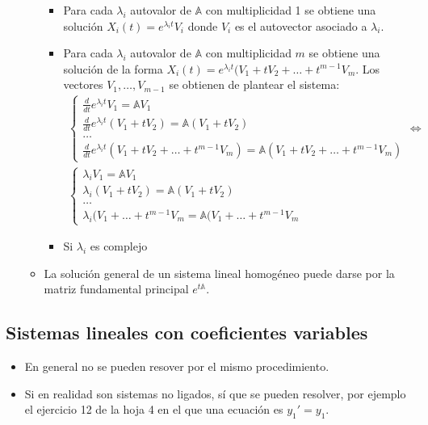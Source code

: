 \begin{itemize}
\begin{itemize}
    \begin{itemize}
    \item
      Para cada \(\lambda_i\) autovalor de \(\mathbb{A}\) con
      multiplicidad 1 se obtiene una solución
      \(X_i(t) = e^{\lambda_i t}V_i\) donde \(V_i\) es el autovector
      asociado a \(\lambda_i\).
    \item
      Para cada \(\lambda_i\) autovalor de \(\mathbb{A}\) con
      multiplicidad \(m\) se obtiene una solución de la forma
      \(X_i(t) = e^{\lambda_i t}(V_1 + tV_2 + \dots + t^{m-1}V_m\). Los
      vectores \(V_1, \dots, V_{m-1}\) se obtienen de plantear el
      sistema: \begin{multline*}
      \begin{cases}
      \frac{d}{dt} e^{\lambda_i t}V_1 = \mathbb{A}V_1 \\
      \frac{d}{dt} e^{\lambda_i t}(V_1 + tV_2) = \mathbb{A}(V_1 + tV_2) \\
      \dots \\
      \frac{d}{dt} e^{\lambda_i t}(V_1 + t V_2 + \dots + t^{m-1} V_m) = \mathbb{A}(V_1 + t V_2 + \dots + t^{m-1} V_m)
      \end{cases} \iff \\
      \begin{cases}
      \lambda_i V_1 = \mathbb{A}V_1 \\
      \lambda_i (V_1 + t V_2) = \mathbb{A}(V_1 + tV_2) \\
      \dots \\
      \lambda_i(V_1 + \dots  + t^{m-1}V_m = \mathbb{A}(V_1 + \dots + t^{m-1}V_m
      \end{cases}
      \end{multline*}
    \item
      Si \(\lambda_i\) es complejo
    \end{itemize}
  \item
    La solución general de un sistema lineal homogéneo puede darse por
    la matriz fundamental principal \(e^{t\mathbb{A}}\).
  \end{itemize}
\end{itemize}

\hypertarget{sistemas-lineales-con-coeficientes-variables}{%
\subsection{Sistemas lineales con coeficientes
variables}\label{sistemas-lineales-con-coeficientes-variables}}

\begin{itemize}
\item
  En general no se pueden resover por el mismo procedimiento.
\item
  Si en realidad son sistemas no ligados, sí que se pueden resolver, por
  ejemplo el ejercicio 12 de la hoja 4 en el que una ecuación es
  \(y_1' = y_1\).
\end{itemize}

